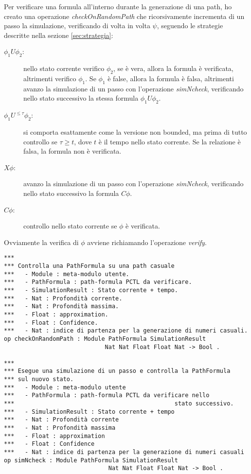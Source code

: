 Per verificare una formula all'interno durante la generazione di una path, ho
creato una operazione \emph{checkOnRandomPath} che ricorsivamente incrementa di
un passo la simulazione, verificando di volta in volta $\psi$, seguendo le
strategie descritte nella sezione \ref{sec:strategia}:
\begin{description}
  \item[$\phi_1 U \phi_2$:]nello stato corrente verifico $\phi_2$,
  se è vera, allora la formula è verificata, altrimenti verifico $\phi_1$. Se
  $\phi_1$ è false, allora la formula è falsa, altrimenti avanzo la simulazione
  di un passo con l'operazione \emph{simNcheck}, verificando nello stato
  successivo la stessa formula $\phi_1 U \phi_2$.
  \item[$\phi_1 U^{\leq \tau} \phi_2$:] si comporta esattamente come la versione
  non bounded, ma prima di tutto controllo se $\tau \geq t$, dove $t$ è il tempo
  nello stato corrente. Se la relazione è falsa, la formula non è verificata.
  \item[$X \phi$:]avanzo la simulazione di un passo con l'operazione
  \emph{simNcheck}, verificando nello stato successivo la formula $C \phi$.
  \item[$C \phi$:]controllo nello stato corrente se $\phi$ è verificata.
\end{description}

Ovviamente la verifica di $\phi$ avviene richiamando l'operazione \emph{verify}.
\begin{Verbatim}[fontsize=\small]
***
*** Controlla una PathFormula su una path casuale
***   - Module : meta-modulo utente.
***   - PathFormula : path-formula PCTL da verificare.
***   - SimulationResult : Stato corrente + tempo.
***   - Nat : Profondità corrente.
***   - Nat : Profondità massima.
***   - Float : approximation.
***   - Float : Confidence.
***   - Nat : indice di partenza per la generazione di numeri casuali.
op checkOnRandomPath : Module PathFormula SimulationResult
                             Nat Nat Float Float Nat -> Bool .
                             
***
*** Esegue una simulazione di un passo e controlla la PathFormula
*** sul nuovo stato.
***   - Module : meta-modulo utente
***   - PathFormula : path-formula PCTL da verificare nello
***                                              stato successivo.
***   - SimulationResult : Stato corrente + tempo
***   - Nat : Profondità corrente
***   - Nat : Profondità massima
***   - Float : approximation
***   - Float : Confidence
***   - Nat : indice di partenza per la generazione di numeri casuali
op simNcheck : Module PathFormula SimulationResult
                              Nat Nat Float Float Nat -> Bool .

\end{Verbatim}

